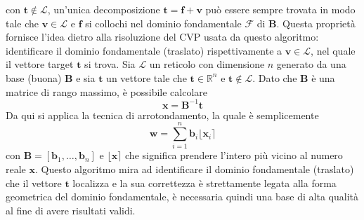 con $\mathbf{t} \notin \mathcal{L}$, un'unica decomposizione $\mathbf{t} = \mathbf{f} + \mathbf{v}$
può essere sempre trovata in modo tale che $\mathbf{v} \in \mathcal{L}$ e $\mathbf{f}$ si collochi
nel dominio fondamentale $\mathcal{F}$ di $\mathbf{B}$. Questa proprietà fornisce l'idea
dietro alla risoluzione del CVP usata da questo algoritmo: identificare il dominio fondamentale (traslato) rispettivamente
a $\mathbf{v} \in \mathcal{L}$, nel quale il vettore target $\mathbf{t}$ si trova. 
Sia $\mathcal{L}$ un reticolo con 
dimensione $n$ generato da una base (buona) $\mathbf{B}$ e sia $\mathbf{t}$ un vettore tale che
$\mathbf{t} \in \mathbb{R}^n$ e $\mathbf{t} \notin \mathcal{L}$. Dato che $\mathbf{B}$ è una
matrice di rango massimo, è possibile calcolare
\[
    \mathbf{x} =  \mathbf{B}^{-1}\mathbf{t}
\]
Da qui si applica la tecnica di arrotondamento, la quale è semplicemente
\[
    \mathbf{w} = \sum_{i=1}^{n} \mathbf{b}_i \lfloor \mathbf{x}_i \rceil 
\]
con $\mathbf{B} = [\mathbf{b}_1,\dots,\mathbf{b}_n]$ e $\lfloor\mathbf{x}\rceil$ che significa
prendere l'intero più vicino al numero reale $\mathbf{x}$. Questo algoritmo mira ad 
identificare il dominio fondamentale (traslato) che il vettore $\mathbf{t}$ localizza e la sua
correttezza è strettamente legata alla forma geometrica del dominio fondamentale, è necessaria
quindi una base di alta qualità al fine di avere risultati validi. 

